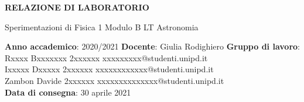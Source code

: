 \documentclass[a4paper,11pt,titlepage]{book}
\begin{document}
\begin{center}
\textbf{{\LARGE RELAZIONE DI LABORATORIO}}
\end{center}
\vspace{1cm}
\begin{center}
Sperimentazioni di Fisica 1  Modulo B  LT Astronomia
\end{center}
\vspace{2cm}
\begin{flushleft}
\textbf{Anno accademico}: 2020/2021 \hspace{5.5cm} \textbf{Docente}: Giulia Rodighiero
\vspace{2cm}
\textbf{Gruppo di lavoro}:\\
\vspace{1cm}
Rxxxx Bxxxxxxx \hspace{0.6cm}  2xxxxxx  \hspace{0.6cm} xxxxxxxxx@studenti.unipd.it\\
\vspace{1cm}
Ixxxxx Dxxxxx \hspace{0.32cm}  2xxxxxx \hspace{0.59cm}  xxxxxxxxxxxx@studenti.unipd.it\\
\vspace{1cm}
Zambon Davide  \hspace{0.37cm} 2xxxxxx \hspace{0.6cm}  xxxxxxxxxxxxxx@studenti.unipd.it\\
\vspace{2cm}
\textbf{Data di consegna}: 30 aprile 2021
\end{flushleft}
\vspace{2cm}
\newpage
\end{document}
